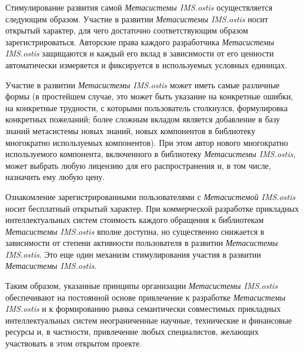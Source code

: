 \begin{SCn}
\begin{scnsubstruct}
{\begin{scnitemize}
                \item Стимулирование развития самой \textit{Метасистемы IMS.ostis} осуществляется следующим образом. Участие в развитии \textit{Метасистемы IMS.ostis} носит открытый характер, для чего достаточно соответствующим образом зарегистрироваться. Авторские права каждого разработчика \textit{Метасистемы IMS.ostis} защищаются и каждый его вклад в зависимости от его ценности автоматически измеряется и фиксируется в используемых условных единицах.\item Участие в развитии \textit{Метасистемы IMS.ostis} может иметь самые различные формы (в простейшем случае, это может быть указание на конкретные ошибки, на конкретные трудности, с которыми пользователь столкнулся, формулировка конкретных пожеланий; более сложным вкладом является добавление в базу знаний метасистемы новых знаний, новых компонентов в библиотеку многократно используемых компонентов). При этом автор нового многократно используемого компонента, включенного в библиотеку \textit{Метасистемы IMS.ostis}, может выбрать любую лицензию для его распространения и, в том числе, назначить ему любую цену.
                \item Ознакомление зарегистрированными пользователями с \textit{Метасистемой IMS.ostis} носит бесплатный открытый характер. При коммерческой разработке прикладных интеллектуальных систем стоимость каждого обращения к библиотекам \textit{Метасистемы IMS.ostis} вполне доступна, но существенно снижается в зависимости от степени активности пользователя в развитии \textit{Метасистемы IMS.ostis}. Это еще один механизм стимулирования участия в развитии \textit{Метасистемы IMS.ostis}.
            \end{scnitemize}
            Таким образом, указанные принципы организации \textit{Метасистемы IMS.ostis} обеспечивают на постоянной основе привлечение к разработке \textit{Метасистемы IMS.ostis} и к формированию рынка семантически совместимых прикладных интеллектуальных систем неограниченные научные, технические и финансовые ресурсы и, в частности, привлечение любых специалистов, желающих участвовать в этом открытом проекте.}
            

\end{scnsubstruct}
\end{SCn}
